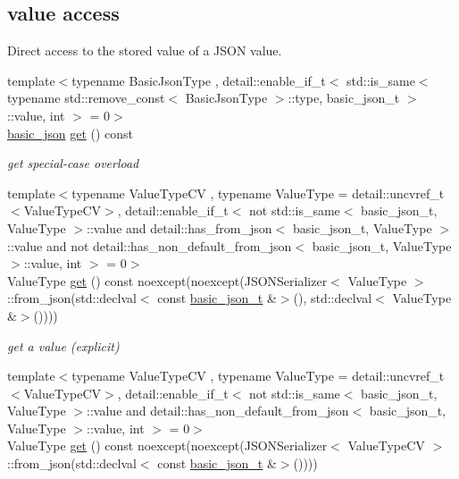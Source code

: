 \subsection*{value access}
\label{_amgrpd8f53c9caf18314e5b3f758245606995}%
Direct access to the stored value of a J\+S\+ON value. \begin{DoxyCompactItemize}
\item 
{\footnotesize template$<$typename Basic\+Json\+Type , detail\+::enable\+\_\+if\+\_\+t$<$ std\+::is\+\_\+same$<$ typename std\+::remove\+\_\+const$<$ Basic\+Json\+Type $>$\+::type, basic\+\_\+json\+\_\+t $>$\+::value, int $>$  = 0$>$ }\\\hyperlink{classnlohmann_1_1basic__json}{basic\+\_\+json} \hyperlink{classnlohmann_1_1basic__json_a6b187a22994c12c8cae0dd5ee99dc85e}{get} () const
\begin{DoxyCompactList}\small\item\em get special-\/case overload \end{DoxyCompactList}\item 
{\footnotesize template$<$typename Value\+Type\+CV , typename Value\+Type  = detail\+::uncvref\+\_\+t$<$\+Value\+Type\+C\+V$>$, detail\+::enable\+\_\+if\+\_\+t$<$ not std\+::is\+\_\+same$<$ basic\+\_\+json\+\_\+t, Value\+Type $>$\+::value and detail\+::has\+\_\+from\+\_\+json$<$ basic\+\_\+json\+\_\+t, Value\+Type $>$\+::value and not detail\+::has\+\_\+non\+\_\+default\+\_\+from\+\_\+json$<$ basic\+\_\+json\+\_\+t, Value\+Type $>$\+::value, int $>$  = 0$>$ }\\Value\+Type \hyperlink{classnlohmann_1_1basic__json_a16f9445f7629f634221a42b967cdcd43}{get} () const noexcept(noexcept(J\+S\+O\+N\+Serializer$<$ Value\+Type $>$\+::from\+\_\+json(std\+::declval$<$ const \hyperlink{classnlohmann_1_1basic__json_afc4033f5af721feb287b0676723a145f}{basic\+\_\+json\+\_\+t} \&$>$(), std\+::declval$<$ Value\+Type \&$>$())))
\begin{DoxyCompactList}\small\item\em get a value (explicit) \end{DoxyCompactList}\item 
{\footnotesize template$<$typename Value\+Type\+CV , typename Value\+Type  = detail\+::uncvref\+\_\+t$<$\+Value\+Type\+C\+V$>$, detail\+::enable\+\_\+if\+\_\+t$<$ not std\+::is\+\_\+same$<$ basic\+\_\+json\+\_\+t, Value\+Type $>$\+::value and detail\+::has\+\_\+non\+\_\+default\+\_\+from\+\_\+json$<$ basic\+\_\+json\+\_\+t, Value\+Type $>$\+::value, int $>$  = 0$>$ }\\Value\+Type \hyperlink{classnlohmann_1_1basic__json_ab728c42baff9d11409d4f99d9f95d6af}{get} () const noexcept(noexcept(J\+S\+O\+N\+Serializer$<$ Value\+Type\+CV $>$\+::from\+\_\+json(std\+::declval$<$ const \hyperlink{classnlohmann_1_1basic__json_afc4033f5af721feb287b0676723a145f}{basic\+\_\+json\+\_\+t} \&$>$())))

\end{DoxyCompactItemize}

